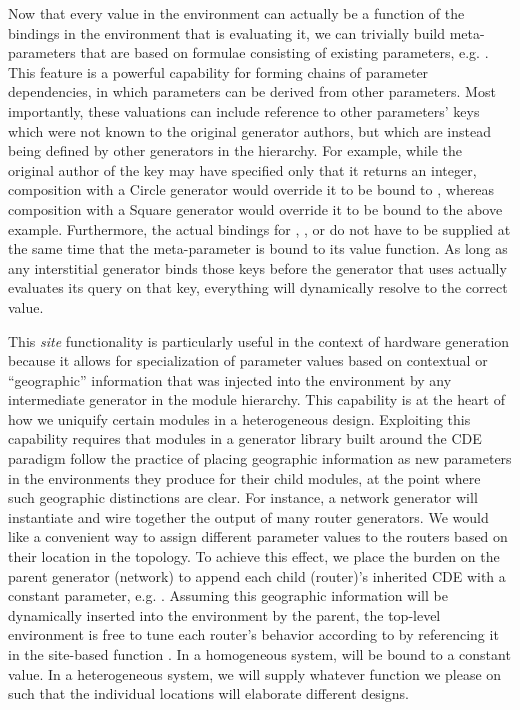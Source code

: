 Now that every value in the environment can actually be a function of the bindings in the environment that is evaluating it, we can trivially
build meta-parameters that are based on formulae consisting of existing parameters, e.g. .
This feature is a powerful capability for forming chains of parameter dependencies, in which parameters can be derived from other parameters.
Most importantly, these valuations can include reference to other parameters' keys which were not known to the original generator authors,
but which are instead being defined by other generators in the hierarchy.
For example, while the original author of the  key may have specified only that it returns an integer,
composition with a Circle generator would override it to be bound to , whereas
composition with a Square generator would override it to be bound to the above example.
Furthermore, the actual bindings for , , or  do not have to be supplied at the same time that
the meta-parameter  is bound to its value function.
As long as any interstitial generator binds those keys before the generator that uses  actually evaluates its query on that key,
everything will dynamically resolve to the correct value.

This \emph{site} functionality is particularly useful in the context of hardware generation because 
it allows for specialization of parameter values based on contextual or ``geographic'' information that was injected into the environment by any intermediate generator in the module hierarchy.
This capability is at the heart of how we uniquify certain modules in a heterogeneous design.
Exploiting this capability requires that modules in a generator library built around the CDE paradigm follow the practice of placing geographic information
as new parameters in the environments they produce for their child modules, at the point where such geographic distinctions are clear. 
For instance, a network generator will instantiate and wire together the output of many router generators.
We would like a convenient way to assign different parameter values to the routers based on their location in the topology.
To achieve this effect, we place the burden on the parent generator (network) to append each child (router)'s inherited CDE with a constant parameter, e.g. .
Assuming this geographic information will be dynamically inserted into the environment by the parent,
the top-level environment is free to tune each router's behavior according to 
by referencing it in the site-based function .
In a homogeneous system,  will be bound to a constant value.
In a heterogeneous system, we will supply whatever function we please on 
such that the individual locations will elaborate different designs.

